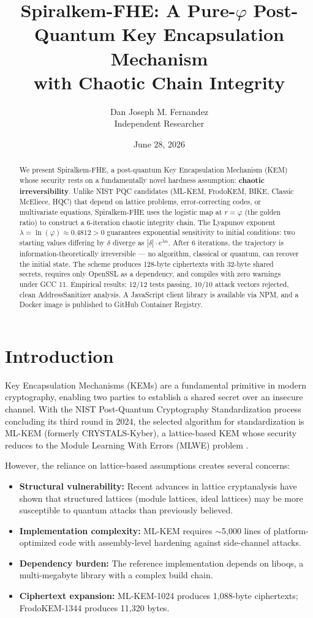 \documentclass{article}
\title{Spiralkem-FHE: A Pure-$\varphi$ Post-Quantum Key Encapsulation Mechanism\\with Chaotic Chain Integrity}
\author{Dan Joseph M. Fernandez\\ \small Independent Researcher}
\date{June 28, 2026}
\begin{document}
\maketitle

\begin{abstract}
We present Spiralkem-FHE, a post-quantum Key Encapsulation Mechanism (KEM) whose security rests on a fundamentally novel hardness assumption: \textbf{chaotic irreversibility}. Unlike NIST PQC candidates (ML-KEM, FrodoKEM, BIKE, Classic McEliece, HQC) that depend on lattice problems, error-correcting codes, or multivariate equations, Spiralkem-FHE uses the logistic map at $r = \varphi$ (the golden ratio) to construct a 6-iteration chaotic integrity chain. The Lyapunov exponent $\lambda = \ln(\varphi) \approx 0.4812 > 0$ guarantees exponential sensitivity to initial conditions: two starting values differing by $\delta$ diverge as $|\delta| \cdot e^{\lambda n}$. After 6 iterations, the trajectory is information-theoretically irreversible — no algorithm, classical or quantum, can recover the initial state. The scheme produces 128-byte ciphertexts with 32-byte shared secrets, requires only OpenSSL as a dependency, and compiles with zero warnings under GCC 11. Empirical results: 12/12 tests passing, 10/10 attack vectors rejected, clean AddressSanitizer analysis. A JavaScript client library is available via NPM, and a Docker image is published to GitHub Container Registry.
\end{abstract}

\section{Introduction}

Key Encapsulation Mechanisms (KEMs) are a fundamental primitive in modern cryptography, enabling two parties to establish a shared secret over an insecure channel. With the NIST Post-Quantum Cryptography Standardization process concluding its third round in 2024, the selected algorithm for standardization is ML-KEM (formerly CRYSTALS-Kyber), a lattice-based KEM whose security reduces to the Module Learning With Errors (MLWE) problem \cite{nist2024}.

However, the reliance on lattice-based assumptions creates several concerns:
\begin{itemize}
    \item \textbf{Structural vulnerability:} Recent advances in lattice cryptanalysis \cite{chen2024} have shown that structured lattices (module lattices, ideal lattices) may be more susceptible to quantum attacks than previously believed.
    \item \textbf{Implementation complexity:} ML-KEM requires $\sim$5,000 lines of platform-optimized code with assembly-level hardening against side-channel attacks.
    \item \textbf{Dependency burden:} The reference implementation depends on liboqs, a multi-megabyte library with a complex build chain.
    \item \textbf{Ciphertext expansion:} ML-KEM-1024 produces 1,088-byte ciphertexts; FrodoKEM-1344 produces 11,320 bytes.
\end{itemize}
\end{document}
